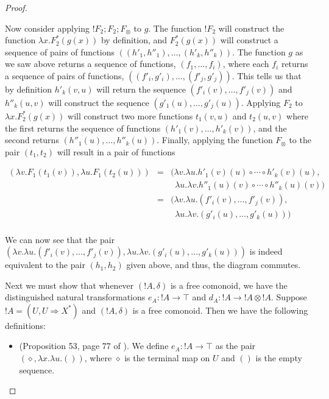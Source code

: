 \documentclass{elsarticle}
\begin{document}
\begin{proof}
\begin{report}
\begin{center}
\begin{itemize}
      Now consider applying $!F_2;F_2;F_\otimes$ to $g$.  The function
      $!F_2$ will construct the function $\lambda x.F^*_2(g(x))$ by
      definition, and $F^*_2(g(x))$ will construct a sequence of pairs
      of functions $((h'_1,h''_1),\ldots,(h'_k,h''_k))$. The function
      $g$ as we saw above returns a sequence of functions,
      $(f_1,\ldots,f_i)$, where each $f_i$ returns a sequence of pairs
      of functions, $((f'_i,g'_i),\ldots,(f'_j,g'_j))$.  This tells us
      that by definition $h'_k(v,u)$ will return the sequence
      $(f'_i(v),\ldots,f'_j(v))$ and $h''_k(u,v)$ will construct the
      sequence $(g'_1(u),\ldots,g'_j(u))$.  Applying $F_2$ to $\lambda
      x.F^*_2(g(x))$ will construct two more functions $t_1(v,u)$ and
      $t_2(u,v)$ where the first returns the sequence of functions
      $(h'_1(v),\ldots,h'_k(v))$, and the second returns
      $(h''_1(u),\ldots,h''_k(u))$.  Finally, applying the function
      $F_\otimes$ to the pair $(t_1,t_2)$ will result in a pair of
      functions
      \begin{center}
        \begin{math}
          \begin{array}{lll}
            (\lambda v.F_1(t_1(v)),\lambda u.F_1(t_2(u)))
            & = & (\lambda v.\lambda u.h'_1(v)(u) \circ \cdots \circ h'_k(v)(u),\\
            &   & \,\,\,\lambda u.\lambda v.h''_1(u)(v) \circ \cdots \circ h''_k(u)(v))\\
            & = & (\lambda v.\lambda u.(f'_i(v),\ldots,f'_j(v)),\\
            &   & \,\,\,\lambda u.\lambda v.(g'_i(u), \ldots, g'_k(u)))\\
          \end{array}
        \end{math}
      \end{center} 
      We can now see that the pair
      $(\lambda v.\lambda u.(f'_i(v),\ldots,f'_j(v)),\lambda u.\lambda v.(g'_i(u), \ldots, g'_k(u)))$ is indeed
      equivalent to the pair $(h_1,h_2)$ given above, and thus, the diagram commutes.      
    \end{itemize}
  \end{center}
  Next we must show that whenever $(!A,\delta)$ is a free comonoid, we
  have the distinguished natural transformations $e_A : !A \to \top$
  and $d_A : !A \to !A \otimes !A$.  Suppose $!A = (U, U \Rightarrow
  X^*)$ and $(!A,\delta)$ is a free comonoid.  Then we have the
  following definitions:
  \begin{itemize}
  \item (Proposition 53, page 77 of \cite{dePaiva:1988}).  We define
    $e_A : !A \to \top$ as the pair $(\diamond,\lambda x.\lambda
    u.())$, where $\diamond$ is the terminal map on $U$ and $()$ is
    the empty sequence.
    

\end{itemize}
\end{report}
\end{proof}
\end{document}
